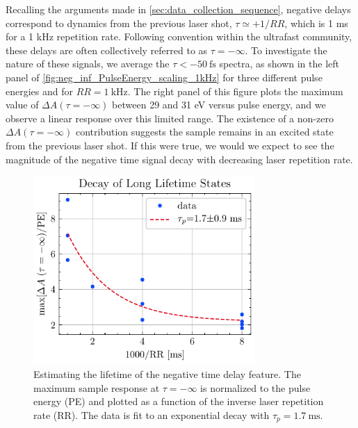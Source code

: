 Recalling the arguments made in \cref{sec:data_collection_sequence}, negative delays correspond to dynamics from the previous laser shot, $\tau \simeq +1/RR$, which is 1 ms for a 1 kHz repetition rate. Following convention within the ultrafast community, these delays are often collectively referred to as $\tau = -\infty$. To investigate the nature of these signals, we average the $\tau < -50 \ \textrm{fs}$ spectra, as shown in the left panel of \cref{fig:neg_inf_PulseEnergy_scaling_1kHz} for three different pulse energies and for $RR = 1 \ \textrm{kHz}$. The right panel of this figure plots the maximum value of $\Delta A(\tau=-\infty)$ between 29 and 31 eV versus pulse energy, and we observe a linear response over this limited range. The existence of a non-zero $\Delta A(\tau=-\infty)$ contribution suggests the sample remains in an excited state from the previous laser shot. If this were true, we would we expect to see the magnitude of the negative time signal decay with decreasing laser repetition rate.

\begin{figure}
	\centering
	\includegraphics[width=0.75\textwidth]{figures/chap4/long_lifetime_states_PulseEnergy.pdf}
	\caption{Estimating the lifetime of the negative time delay feature. The maximum sample response at $\tau = -\infty$ is normalized to the pulse energy (PE) and plotted as a function of the inverse laser repetition rate (RR). The data is fit to an exponential decay with $\tau_p = 1.7 \ \textrm{ms}$.}
	\label{fig:long_lifetime_states}
\end{figure}

